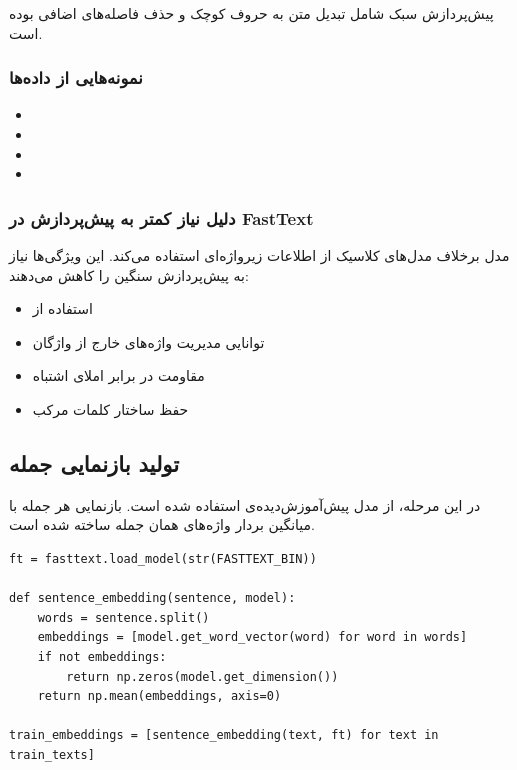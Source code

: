 \documentclass[12pt,a4paper]{article}
\begin{document}
پیش‌پردازش سبک شامل تبدیل متن به حروف کوچک و حذف فاصله‌های اضافی بوده است.

\subsubsection{نمونه‌هایی از داده‌ها}
\begin{itemize}
\item {}
\item {}
\item {}
\item {}
\end{itemize}

\subsubsection{دلیل نیاز کمتر به پیش‌پردازش در FastText}
مدل  برخلاف مدل‌های کلاسیک  از اطلاعات زیرواژه‌ای استفاده می‌کند. این ویژگی‌ها نیاز به پیش‌پردازش سنگین را کاهش می‌دهند:

\begin{itemize}
\item استفاده از 
\item توانایی مدیریت واژه‌های خارج از واژگان 
\item مقاومت در برابر املای اشتباه
\item حفظ ساختار کلمات مرکب
\end{itemize}

\subsection{تولید بازنمایی جمله}
در این مرحله، از مدل پیش‌آموزش‌دیده‌ی  استفاده شده است. بازنمایی هر جمله با میانگین بردار واژه‌های همان جمله ساخته شده است.

\begin{lstlisting}[caption=کد بارگذاری FastText و تولید بازنمایی جمله]
ft = fasttext.load_model(str(FASTTEXT_BIN))

def sentence_embedding(sentence, model):
    words = sentence.split()
    embeddings = [model.get_word_vector(word) for word in words]
    if not embeddings:
        return np.zeros(model.get_dimension())
    return np.mean(embeddings, axis=0)

train_embeddings = [sentence_embedding(text, ft) for text in train_texts]
\end{lstlisting}
\end{document}
